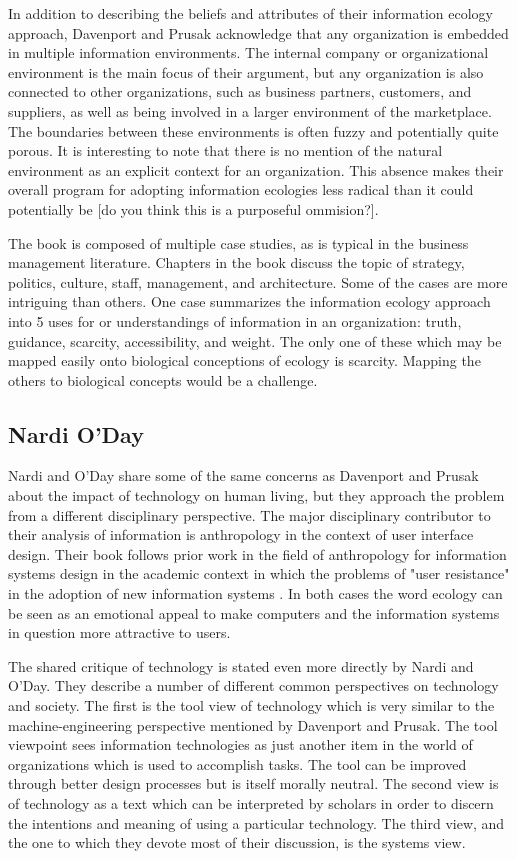 In addition to describing the beliefs and attributes of their information ecology approach, Davenport and Prusak acknowledge that any organization is embedded in multiple information environments. The internal company or organizational environment is the main focus of their argument, but any organization is also connected to other organizations, such as business partners, customers, and suppliers, as well as being involved in a larger environment of the marketplace. The boundaries between these environments is often fuzzy and potentially quite porous. It is interesting to note that there is no mention of the natural environment as an explicit context for an organization. This absence makes their overall program for adopting information ecologies less radical than it could potentially be [do you think this is a purposeful ommision?].

The book is composed of multiple case studies, as is typical in the business management literature. Chapters in the book discuss the topic of strategy, politics, culture, staff, management, and architecture. Some of the cases are more intriguing than others. One case summarizes the information ecology approach into 5 uses for or understandings of information in an organization: truth, guidance, scarcity, accessibility, and weight. The only one of these which may be mapped easily onto biological conceptions of ecology is scarcity. Mapping the others to biological concepts would be a challenge.

\subsection{Nardi O'Day}

Nardi and O'Day share some of the same concerns as Davenport and Prusak about the impact of technology on human living, but they approach the problem from a different disciplinary perspective. The major disciplinary contributor to their analysis of information is anthropology in the context of user interface design. Their book follows prior work in the field of anthropology for information systems design in the academic context in which the problems of "user resistance" in the adoption of new information systems \citep{star_1996}. In both cases the word ecology can be seen as an emotional appeal to make computers and the information systems in question more attractive to users.

The shared critique of technology is stated even more directly by Nardi and O'Day. They describe a number of different common perspectives on technology and society. The first is the tool view of technology which is very similar to the machine-engineering perspective mentioned by Davenport and Prusak. The tool viewpoint sees information technologies as just another item in the world of organizations which is used to accomplish tasks. The tool can be improved through better design processes but is itself morally neutral. The second view is of technology as a text which can be interpreted by scholars in order to discern the intentions and meaning of using a particular technology. The third view, and the one to which they devote most of their discussion, is the systems view.

